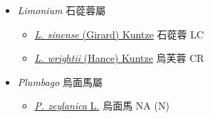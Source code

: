 
  \begin{itemize}
 \item[] \textit{Limonium} 石蓯蓉屬
                                
  \begin{itemize}
        \item[] \href{http://www.theplantlist.org/tpl1.1/search?q=Limonium+sinense}{\textit{L. sinense} (Girard) Kuntze}   石蓯蓉   LC
        \item[] \href{http://www.theplantlist.org/tpl1.1/search?q=Limonium+wrightii}{\textit{L. wrightii} (Hance) Kuntze}   烏芙蓉   CR
  \end{itemize}
 \item[] \textit{Plumbago} 烏面馬屬
                                
  \begin{itemize}
        \item[] \href{http://www.theplantlist.org/tpl1.1/search?q=Plumbago+zeylanica}{\textit{P. zeylanica} L.}   烏面馬   NA (N)
  \end{itemize}
  \end{itemize}
